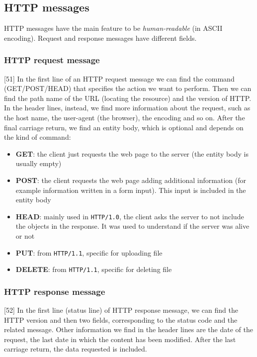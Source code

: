 \subsection{HTTP messages}
HTTP messages have the main feature to be \textit{human-readable} (in ASCII encoding). Request and response messages have different fields.

\subsubsection{HTTP request message}
[51] In the first line of an HTTP request message we can find the command (GET/POST/HEAD) that specifies the action we want to perform. Then we can find the path name of the URL (locating the resource) and the version of HTTP. In the header lines, instead, we find more information about the request, such as the host name, the user-agent (the browser), the encoding and so on. After the final carriage return, we find an entity body, which is optional and depends on the kind of command:
\begin{itemize}
    \item \textbf{GET}: the client just requests the web page to the server (the entity body is usually empty)
    \item \textbf{POST}: the client requests the web page adding additional information (for example information written in a form input). This input is included in the entity body
    \item \textbf{HEAD}: mainly used in \texttt{HTTP/1.0}, the client asks the server to not include the objects in the response. It was used to understand if the server was alive or not
    \item \textbf{PUT}: from \texttt{HTTP/1.1}, specific for uploading file
    \item \textbf{DELETE}: from \texttt{HTTP/1.1}, specific for deleting file
\end{itemize}

\subsubsection{HTTP response message}
[52] In the first line (status line) of HTTP response message, we can find the HTTP version and then two fields, corresponding to the status code and the related message. Other information we find in the header lines are the date of the request, the last date in which the content has been modified. After the last carriage return, the data requested is included.

